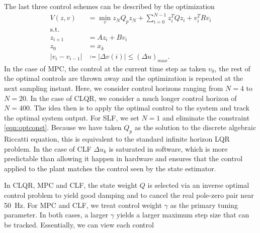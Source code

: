 \documentclass[journal,12pt,twocolumn,twoside]{IEEEtran/IEEEtran}
\begin{document}
The last three control schemes can be described by the optimization
\begin{align}
V(z,v) &= \min_{v} z_{N}Q_{p}z_{N} + \sum_{i=0}^{N-1}z_{i}^{T}Qz_{i} + v^{T}_{i}Rv_{i}\\
 \text{s.t.}&\\
z_{i+1} &= Az_{i} + Bv_{i}\\
z_{0} &= x_{k}\\
|v_i - v_{i-1}| &\coloneqq |\Delta v(i)| \leq (\Delta u)_{max}.\label{eqn:optconst}
\end{align}
In the case of MPC, the control at the current time step as taken $v_0$, the rest of the optimal controls are thrown away and the optimization is repeated at the next sampling instant. Here, we consider control horizons ranging from $N=4$ to $N=20$. In the case of CLQR, we consider a much longer control horizon of $N=400$. The idea then is to apply the optimal control to the system and track the optimal system output. For SLF, we set $N=1$ and eliminate the constraint \eqref{eqn:optconst}. Because we have taken $Q_p$ as the solution to the discrete algebraic Riccatti equation, this is equivalent to the standard infinite horizon LQR problem. In the case of CLF $\Delta u_k$ is saturated in software, which is more predictable than allowing it happen in hardware and ensures that the control applied to the plant matches the control seen by the state estimator.

In CLQR, MPC and CLF,  the state weight $Q$ is selected via an inverse optimal control problem to yield good damping and to cancel the real pole-zero pair near 50~Hz. For MPC and CLF, we treat control weight $\gamma$ as the primary tuning parameter. In both cases, a larger $\gamma$ yields a larger maximum step size that can be tracked. Essentially, we can view each control 
\end{document}
